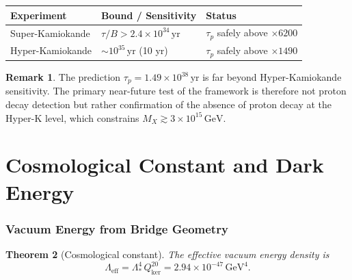 \documentclass[12pt]{article}
\theoremstyle{plain}
\newtheorem{theorem}{Theorem}[section]
\theoremstyle{definition}
\newtheorem{remark}[theorem]{Remark}
\numberwithin{equation}{section}
\newcommand{\kker}{\mathrm{ker}}
\newcommand{\eff}{\mathrm{eff}}
\begin{document}
\begin{center}
\begin{tabular}{lll}
\toprule
Experiment & Bound / Sensitivity & Status\\
\midrule
Super-Kamiokande & $\tau/B > 2.4\times10^{34}\,\mathrm{yr}$ & $\tau_p$ safely above $\times6200$ \\
Hyper-Kamiokande & $\sim10^{35}\,\mathrm{yr}$ (10 yr) & $\tau_p$ safely above $\times1490$\\
\bottomrule
\end{tabular}
\end{center}

\begin{remark}
The prediction $\tau_p=1.49\times10^{38}\,\mathrm{yr}$ is far beyond
Hyper-Kamiokande sensitivity.  The primary near-future test of the
framework is therefore not proton decay detection but rather confirmation
of the absence of proton decay at the Hyper-K level, which constrains
$M_X\gtrsim3\times10^{15}\,\mathrm{GeV}$.
\end{remark}

\part{Cosmological Constant and Dark Energy}

\section{Vacuum Energy from Bridge Geometry}\label{sec:cosmo}

\begin{theorem}[Cosmological constant]\label{thm:cosmo}
The effective vacuum energy density is
\[
\boxed{\Lambda_\eff = \Lambda_*^4\, Q_{\kker}^{20}
= 2.94\times10^{-47}\,\mathrm{GeV}^4.}
\]
\end{theorem}
\end{document}
